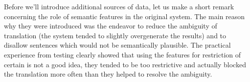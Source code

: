 \documentclass[letterpaper]{article}
\begin{document}



Before we'll introduce additional sources of data, let us make a short remark concerning the role of semantic features in the original system. 
The main reason why they were introduced was the endeavor to reduce the ambiguity of translation (the system tended to slightly overgenerate the results) and to disallow sentences which would not be semantically plausible. The practical experience from testing clearly showed that using the features for restriction of certain is not a good idea, they tended to be too restrictive and actually blocked the translation more often than they helped to resolve the ambiguity.
\end{document}
